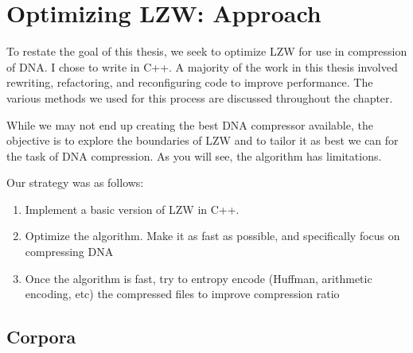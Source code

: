 \documentclass[12pt,twoside]{reedthesis}
\providecommand{\tightlist}{%
  \setlength{\itemsep}{0pt}\setlength{\parskip}{0pt}}
\begin{document}
\hypertarget{optimizing-lzw-approach}{%
\chapter{Optimizing LZW: Approach}\label{optimizing-lzw-approach}}

To restate the goal of this thesis, we seek to optimize LZW for use in compression of DNA. I chose to write in C++. A majority of the work in this thesis involved rewriting, refactoring, and reconfiguring code to improve performance. The various methods we used for this process are discussed throughout the chapter.

While we may not end up creating the best DNA compressor available, the objective is to explore the boundaries of LZW and to tailor it as best we can for the task of DNA compression. As you will see, the algorithm has limitations.

Our strategy was as follows:
\begin{enumerate}
\def\labelenumi{\arabic{enumi}.}
\tightlist
\item
  Implement a basic version of LZW in C++.
\item
  Optimize the algorithm. Make it as fast as possible, and specifically focus on compressing DNA
\item
  Once the algorithm is fast, try to entropy encode (Huffman, arithmetic encoding, etc) the compressed files to improve compression ratio
\end{enumerate}
\hypertarget{corpora}{%
\section{Corpora}\label{corpora}}
\end{document}
